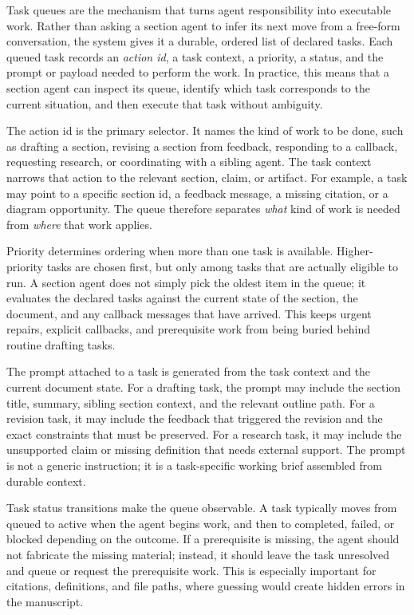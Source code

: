 Task queues are the mechanism that turns agent responsibility into executable work. Rather than asking a section agent to infer its next move from a free-form conversation, the system gives it a durable, ordered list of declared tasks. Each queued task records an \emph{action id}, a task context, a priority, a status, and the prompt or payload needed to perform the work. In practice, this means that a section agent can inspect its queue, identify which task corresponds to the current situation, and then execute that task without ambiguity.

The action id is the primary selector. It names the kind of work to be done, such as drafting a section, revising a section from feedback, responding to a callback, requesting research, or coordinating with a sibling agent. The task context narrows that action to the relevant section, claim, or artifact. For example, a task may point to a specific section id, a feedback message, a missing citation, or a diagram opportunity. The queue therefore separates \emph{what} kind of work is needed from \emph{where} that work applies.

Priority determines ordering when more than one task is available. Higher-priority tasks are chosen first, but only among tasks that are actually eligible to run. A section agent does not simply pick the oldest item in the queue; it evaluates the declared tasks against the current state of the section, the document, and any callback messages that have arrived. This keeps urgent repairs, explicit callbacks, and prerequisite work from being buried behind routine drafting tasks.

The prompt attached to a task is generated from the task context and the current document state. For a drafting task, the prompt may include the section title, summary, sibling section context, and the relevant outline path. For a revision task, it may include the feedback that triggered the revision and the exact constraints that must be preserved. For a research task, it may include the unsupported claim or missing definition that needs external support. The prompt is not a generic instruction; it is a task-specific working brief assembled from durable context.

Task status transitions make the queue observable. A task typically moves from queued to active when the agent begins work, and then to completed, failed, or blocked depending on the outcome. If a prerequisite is missing, the agent should not fabricate the missing material; instead, it should leave the task unresolved and queue or request the prerequisite work. This is especially important for citations, definitions, and file paths, where guessing would create hidden errors in the manuscript.

